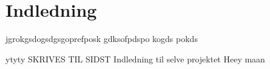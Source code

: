 \chapter{Indledning}
\label{chap:Indledning}

jgrokgsdogsdgsgoprefposk
gdksofpdspo
kogds
pokds


ytyty
\newline
SKRIVES TIL SIDST
\newline
Indledning til selve projektet
\newline
Heey maan
